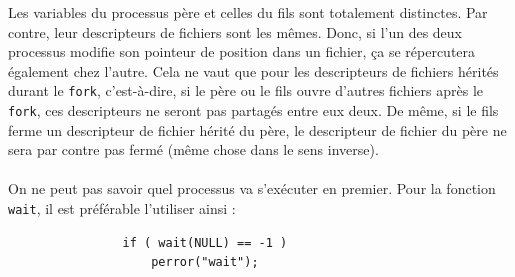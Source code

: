 			Les variables du processus père et celles du fils sont totalement distinctes. Par contre, leur descripteurs de fichiers sont les mêmes. Donc, si l'un des deux processus modifie son pointeur de position dans un fichier, ça se répercutera également chez l'autre. Cela ne vaut que pour les descripteurs de fichiers hérités durant le \lstinline!fork!, c'est-à-dire, si le père ou le fils ouvre d'autres fichiers après le \lstinline!fork!, ces descripteurs ne seront pas partagés entre eux deux. De même, si le fils ferme un descripteur de fichier hérité du père, le descripteur de fichier du père ne sera par contre pas fermé (même chose dans le sens inverse).\\
			~\\
			\noindent On ne peut pas savoir quel processus va s'exécuter en premier. Pour la fonction \lstinline!wait!, il est préférable l'utiliser ainsi :
			\begin{lstlisting}
				if ( wait(NULL) == -1 )
					perror("wait");
			\end{lstlisting}
				
		
		
		